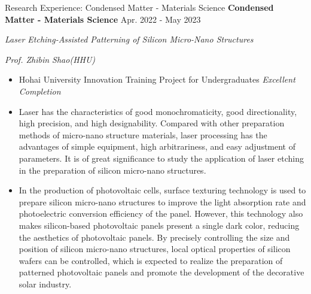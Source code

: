 \documentclass[9pt,aspectratio=169,hyperref=colorlinks]{beamer}
\begin{document}
\begin{frame}{Research Experience: Condensed Matter - Materials Science}
    \medskip \textbf{Condensed Matter - Materials Science} \hfill Apr. 2022 - May 2023

    \quad \textit{Laser Etching-Assisted Patterning of Silicon Micro-Nano Structures}

    \hfill \textit{Prof. Zhibin Shao(HHU)}

    \begin{itemize}
        \item Hohai University Innovation Training Project for Undergraduates \textit{Excellent Completion}
        \item Laser has the characteristics of good monochromaticity, good directionality, high precision, and high designability. Compared with other preparation methods of micro-nano structure materials, laser processing has the advantages of simple equipment, high arbitrariness, and easy adjustment of parameters. It is of great significance to study the application of laser etching in the preparation of silicon micro-nano structures.
        \item In the production of photovoltaic cells, surface texturing technology is used to prepare silicon micro-nano structures to improve the light absorption rate and photoelectric conversion efficiency of the panel. However, this technology also makes silicon-based photovoltaic panels present a single dark color, reducing the aesthetics of photovoltaic panels. By precisely controlling the size and position of silicon micro-nano structures, local optical properties of silicon wafers can be controlled, which is expected to realize the preparation of patterned photovoltaic panels and promote the development of the decorative solar industry.
    \end{itemize}
\end{frame}
\end{document}
